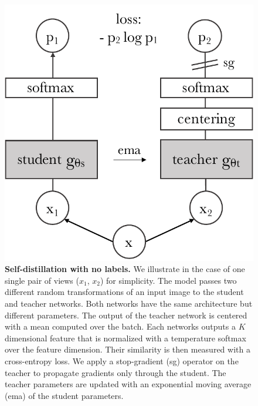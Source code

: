 \begin{figure}[t]
\centering
 \includegraphics[width=0.6\linewidth]{test.pdf}
\caption{
\textbf{Self-distillation with no labels.}
We illustrate \OURS in the case of one single pair of views ($x_1$, $x_2$) for simplicity.
The model passes two different random transformations of an input image to the student and teacher networks.
Both networks have the same architecture but different parameters. 
The output of the teacher network is centered with a mean computed over the batch.
Each networks outputs a $K$ dimensional feature that is normalized with a temperature softmax over the feature dimension.
Their similarity is then measured with a cross-entropy loss.
We apply a stop-gradient (sg) operator on the teacher to propagate gradients only through the student.
The teacher parameters are updated with an exponential moving average (ema) of the student parameters.
}
\vspace{-1em}
\label{fig:model}
\end{figure}



